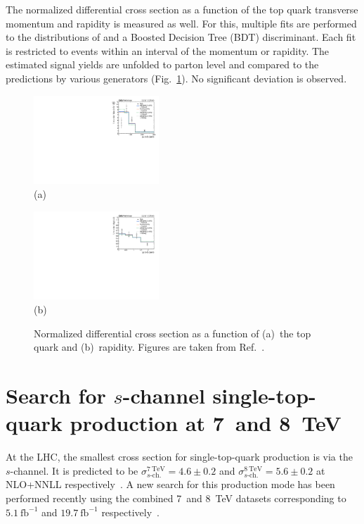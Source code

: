 \documentclass{PoS}
\begin{document}
The normalized differential cross section as a function of the top quark transverse momentum and rapidity is measured as well. For this, multiple fits are performed to the distributions of \mtw and a Boosted Decision Tree (BDT) discriminant. Each fit is restricted to events within an interval of the momentum or rapidity. The estimated signal yields are unfolded to parton level and compared to the predictions by various generators (Fig.~\ref{fig:TOP-16-004-unfolded}). No significant deviation is observed.

\begin{figure}[htbp]
\begin{center}
\parbox[t]{0.49\textwidth}{\centering\includegraphics[width=0.42\textwidth]{figures/tchannel_diff/top_pt_unfolded.pdf}\\(a)}
\parbox[t]{0.49\textwidth}{\centering\includegraphics[width=0.42\textwidth]{figures/tchannel_diff/top_y_unfolded.pdf}\\(b)}
\caption{\label{fig:TOP-16-004-unfolded}Normalized differential cross section as a function of (a)~the top quark \pt and (b)~rapidity. Figures are taken from Ref.~\cite{CMS-PAS-TOP-16-004}.}
\end{center}
\end{figure}



\section{Search for $s$-channel single-top-quark production at 7~and 8~TeV}
At the LHC, the smallest cross section for single-top-quark production is via the $s$-channel. It is predicted to be $\sigma_{s\mbox{-}\mathrm{ch.}}^\mathrm{7~TeV}=4.6\pm0.2$ and $\sigma_{s\mbox{-}\mathrm{ch.}}^\mathrm{8~TeV}=5.6\pm0.2$ at NLO+NNLL respectively~\cite{schannel-xsec}. A new search for this production mode has been performed recently using the combined 7~and 8~TeV datasets corresponding to $5.1~\mathrm{fb}^{-1}$ and $19.7~\mathrm{fb}^{-1}$ respectively~\cite{CMS-PAS-TOP-13-009}.
\end{document}

